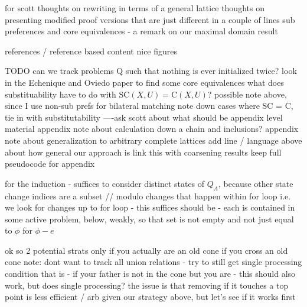 \documentclass[11pt,reqno]{amsart}
\theoremstyle{definition}
\numberwithin{equation}{section}
\newcommand{\pre}{\phi}
\newcommand{\strcore}{\mathrm{SC}(X,U)}
\newcommand{\core}{\mathrm{C}(X,U)}
\newcommand{\acta}{Q_A}
\begin{document}
for scott 
    thoughts on rewriting in terms of a general lattice
    thoughts on presenting modified proof versions that are just different in a couple of lines
    sub preferences and core equivalences - a remark on our maximal domain result



references / reference based content
nice figures


TODO
can we track problems Q such that nothing is ever initialized twice? 
look in the Echenique and Oviedo paper to find some core equivalences
what does substituability have to do with $\strcore = \core$?
    possible note above, since I use non-sub prefs for bilateral matching
note down cases where SC = C, tie in with substitutability
----ask scott about what should be appendix level material 
appendix note about calculation down a chain and inclusions?
appendix note about generalization to arbitrary complete lattices
add line / language above about how general our approach is
link this with coarsening results
keep full pseudocode for appendix




for the induction - suffices to consider distinct states of $\acta$, because other state change indices are a subset // modulo changes that happen within for loop i.e. we look for changes up to for loop - this suffices
    should be - each is contained in some active problem, below, weakly, so that set is not empty and not just equal to $\pre$ for $\pre - e$

ok so 2 potential strats
    only if you actually are an old cone 
    if you cross an old cone 
        note: dont want to track all union relations - try to still get single processing condition
        that is - if your father is not in the cone but you are - this should also work, but does single processing? 
        the issue is that removing if it touches a top point is less efficient / arb given our strategy above, but let's see if it works first 
\end{document}

